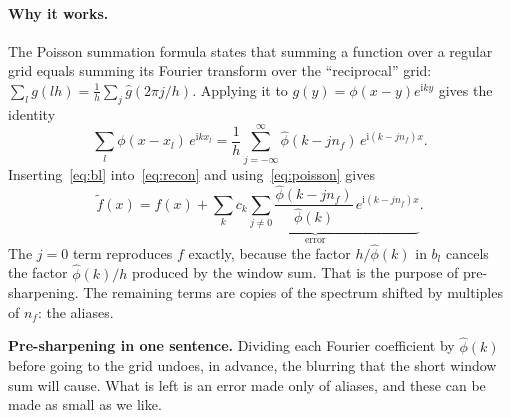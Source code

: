 \documentclass[11pt,a4paper]{article}
\theoremstyle{definition}
\newcommand{\ii}{\mathrm{i}}
\newcommand{\keyidea}[1]{\par\smallskip\noindent\colorbox{boxbg}{\parbox{\dimexpr\linewidth-2\fboxsep}{\small #1}}\par\smallskip}
\begin{document}
\paragraph{Why it works.} The Poisson summation formula states that summing a function over a regular grid equals
summing its Fourier transform over the ``reciprocal'' grid: $\sum_lg(lh)=\frac1h\sum_j\hat g(2\pi j/h)$. Applying it to
$g(y)=\phi(x-y)e^{\ii ky}$ gives the identity
\begin{equation}\label{eq:poisson}
\sum_{l}\phi(x-x_l)\,e^{\ii kx_l}=\frac1h\sum_{j=-\infty}^{\infty}\hat\phi(k-jn_f)\,e^{\ii(k-jn_f)x}.
\end{equation}
Inserting~\eqref{eq:bl} into~\eqref{eq:recon} and using~\eqref{eq:poisson} gives
\begin{equation}\label{eq:error}
\tilde f(x)=f(x)+\underbrace{\sum_{k}c_k\sum_{j\ne0}\frac{\hat\phi(k-jn_f)}{\hat\phi(k)}\,e^{\ii(k-jn_f)x}}_{\text{error}} .
\end{equation}
The $j=0$ term reproduces $f$ exactly, because the factor $h/\hat\phi(k)$ in $b_l$ cancels the factor $\hat\phi(k)/h$ produced by the
window sum. That is the purpose of pre-sharpening. The remaining terms are copies of the spectrum shifted by multiples of $n_f$: the aliases.

\keyidea{\textbf{Pre-sharpening in one sentence.} Dividing each Fourier coefficient by $\hat\phi(k)$ before going to the grid
undoes, in advance, the blurring that the short window sum will cause. What is left is an error made only of aliases, and
these can be made as small as we like.}
\end{document}
